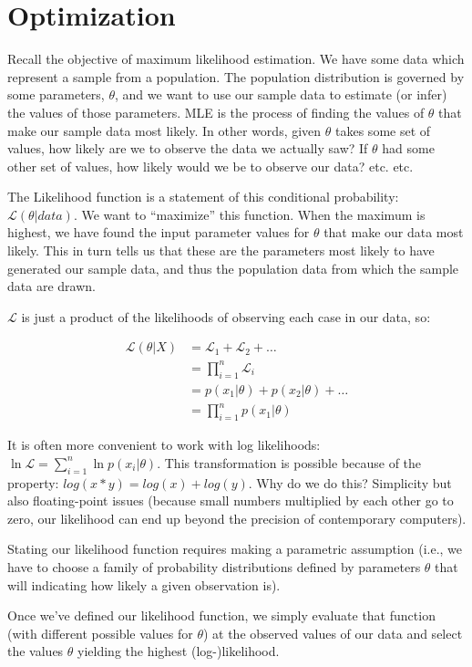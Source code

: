 \documentclass[a4paper,12pt]{article}
\newcommand{\lik}{\mathcal{L}}
\begin{document}
\clearpage
\section{Optimization}

Recall the objective of maximum likelihood estimation. We have some data which represent a sample from a population. The population distribution is governed by some parameters, $\theta$, and we want to use our sample data to estimate (or infer) the values of those parameters. MLE is the process of finding the values of $\theta$ that make our sample data most likely. In other words, given $\theta$ takes some set of values, how likely are we to observe the data we actually saw? If $\theta$ had some other set of values, how likely would we be to observe our data? etc. etc.

The Likelihood function is a statement of this conditional probability: $\lik(\theta|data)$. We want to ``maximize'' this function. When the maximum is highest, we have found the input parameter values for $\theta$ that make our data most likely. This in turn tells us that these are the parameters most likely to have generated our sample data, and thus the population data from which the sample data are drawn.

$\lik$ is just a product of the likelihoods of observing each case in our data, so:

\begin{align*}
\lik(\theta|X) & = \lik_1 + \lik_2 + \dots\\
 & = \prod_{i=1}^{n} \lik_i \\
 & = p(x_1|\theta) + p(x_2|\theta) + \dots\\
 & = \prod_{i=1}^{n} p(x_1|\theta)
\end{align*}

It is often more convenient to work with log likelihoods: $\ln\lik = \sum_{i=1}^{n} \ln p(x_i|\theta)$. This transformation is possible because of the property: $log(x*y) = log(x) + log(y)$. Why do we do this? Simplicity but also floating-point issues (because small numbers multiplied by each other go to zero, our likelihood can end up beyond the precision of contemporary computers).

Stating our likelihood function requires making a parametric assumption (i.e., we have to choose a family of probability distributions defined by parameters $\theta$ that will indicating how likely a given observation is).

Once we've defined our likelihood function, we simply evaluate that function (with different possible values for $\theta$) at the observed values of our data and select the values $\theta$ yielding the highest (log-)likelihood.
\end{document}
